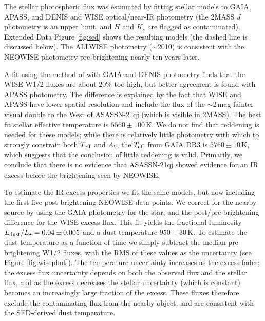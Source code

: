 \documentclass[sn-nature]{sn-jnl}%
\newcommand{\asas}{ASASSN-21qj}
\begin{document}
%
%
% 
The stellar photospheric flux was estimated by fitting stellar models to GAIA, APASS, and DENIS and WISE optical/near-IR photometry (the 2MASS $J$ photometry is an upper limit, and $H$ and $K_s$ are flagged as contaminated).
%
Extended Data Figure \ref{fig:sed} shows the resulting models (the dashed line is discussed below).
%
The ALLWISE photometry ($\sim$2010) is consistent with the NEOWISE photometry pre-brightening nearly ten years later.
%

A fit using the method of \cite{2019MNRAS.488.3588Y} with GAIA and DENIS photometry finds that the WISE W1/2 fluxes are about 20\% too high, but better agreement is found with APASS photometry.
%
The difference is explained by the fact that WISE and APASS have lower spatial resolution and include the flux of the $\sim$2\,mag fainter visual double to the West of \asas{} (which is visible in 2MASS).
%
The best fit stellar effective temperature is $5560 \pm 100$\,K.
%
We do not find that reddening is needed for these models; while there is relatively little photometry with which to strongly constrain both $T_{\rm eff}$ and $A_V$, the $T_{\rm eff}$ from GAIA DR3 is $5760 \pm 10$\,K, which suggests that the conclusion of little reddening is valid.
%
Primarily, we conclude that there is no evidence that \asas{} showed evidence for an IR excess before the brightening seen by NEOWISE.

To estimate the IR excess properties we fit the same models, but now including the first five post-brightening NEOWISE data points.
%
We correct for the nearby source by using the GAIA photometry for the star, and the post/pre-brightening difference for the WISE excess flux.
%
This fit yields the fractional luminosity $L_{\rm dust}/L_\star = 0.04 \pm 0.005$ and a dust temperature $950 \pm 30$\,K.
%
To estimate the dust temperature as a function of time we simply subtract the median pre-brightening W1/2 fluxes, with the RMS of these values as the uncertainty (see Figure \ref{fig:wisephot}).
%
The temperature uncertainty increases as the excess fades; the excess flux uncertainty depends on both the observed flux and the stellar flux, and as the excess decreases the stellar uncertainty (which is constant) becomes an increasingly large fraction of the excess.
%
These fluxes therefore exclude the contaminating flux from the nearby object, and are consistent with the SED-derived dust temperature.
\end{document}
